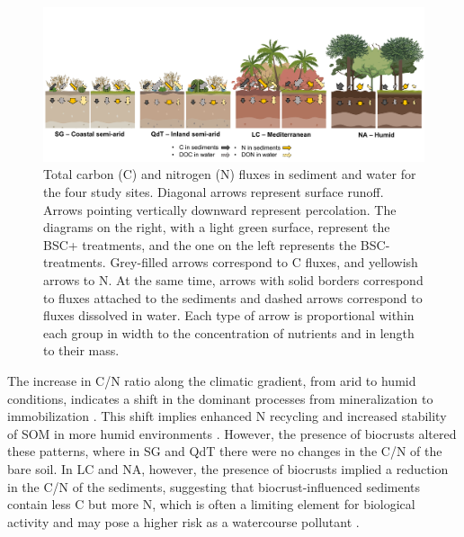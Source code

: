 \begin{figure}[H]
	\centering
	\includegraphics[width=1\textwidth]{img/M2-Figure_4.png}
	\caption[Conceptual diagram of total carbon (C) and nitrogen (N) fluxes in sediment and water for the four study sites]{Total carbon (C) and nitrogen (N) fluxes in sediment and water for the four study sites. Diagonal arrows represent surface runoff. Arrows pointing vertically downward represent percolation. The diagrams on the right, with a light green surface, represent the BSC+ treatments, and the one on the left represents the BSC- treatments. Grey-filled arrows correspond to C fluxes, and yellowish arrows to N. At the same time, arrows with solid borders correspond to fluxes attached to the sediments and dashed arrows correspond to fluxes dissolved in water. Each type of arrow is proportional within each group in width to the concentration of nutrients and in length to their mass.}
	\label{fig:M2-F4}
\end{figure}

\FloatBarrier

The increase in C/N ratio along the climatic gradient, from arid to humid conditions, indicates a shift in the dominant processes from mineralization to immobilization \citep{Brust2019}. This shift implies enhanced N recycling and increased stability of SOM in more humid environments \citep{Oeser2020}. However, the presence of biocrusts altered these patterns, where in SG and QdT there were no changes in the C/N of the bare soil. In LC and NA, however, the presence of biocrusts implied a reduction in the C/N of the sediments, suggesting that biocrust-influenced sediments contain less C but more N, which is often a limiting element for biological activity \citep{Hanrahan2005} and may pose a higher risk as a watercourse pollutant \citep{Dodds2016}.

